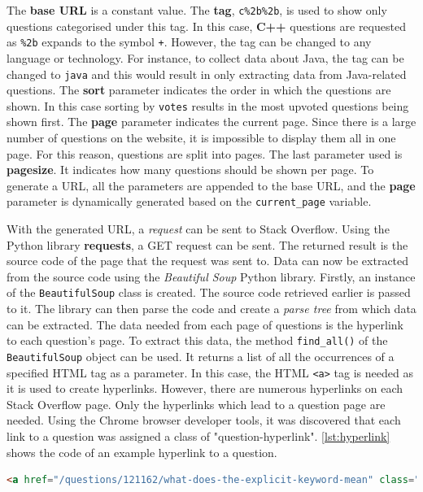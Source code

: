 \documentclass[12pt,a4paper]{article}
\newcommand{\captionstyle}[1] {
    \small{#1}
}
\begin{document}
The \textbf{base URL} is a constant value. The \textbf{tag}, \texttt{c\%2b\%2b}, is used to show only questions categorised under this tag. In this case, \textbf{C++} questions are requested as \texttt{\%2b} expands to the symbol \texttt{+}. However, the tag can be changed to any language or technology. For instance, to collect data about Java, the tag can be changed to \texttt{java} and this would result in only extracting data from Java-related questions. The \textbf{sort} parameter indicates the order in which the questions are shown. In this case sorting by \texttt{votes} results in the most upvoted questions being shown first. The \textbf{page} parameter indicates the current page. Since there is a large number of questions on the website, it is impossible to display them all in one page. For this reason, questions are split into pages. The last parameter used is \textbf{pagesize}. It indicates how many questions should be shown per page. To generate a URL, all the parameters are appended to the base URL, and the \textbf{page} parameter is dynamically generated based on the \texttt{current\_page} variable. 

With the generated URL, a \textit{request} can be sent to Stack Overflow. Using the Python library \textbf{requests}, a GET request can be sent. The returned result is the source code of the page that the request was sent to. Data can now be extracted from the source code using the \textit{Beautiful Soup} Python library. Firstly, an instance of the \texttt{BeautifulSoup} class is created. The source code retrieved earlier is passed to it. The library can then parse the code and create a \textit{parse tree} from which data can be extracted. The data needed from each page of questions is the hyperlink to each question's page. To extract this data, the method \texttt{find\_all()} of the \texttt{BeautifulSoup} object can be used. It returns a list of all the occurrences of a specified HTML tag as a parameter. In this case, the HTML \texttt{<a>} tag is needed as it is used to create hyperlinks. However, there are numerous hyperlinks on each Stack Overflow page. Only the hyperlinks which lead to a question page are needed. Using the Chrome browser developer tools, it was discovered that each link to a question was assigned a class of "question-hyperlink". \cref{lst:hyperlink} shows the code of an example hyperlink to a question.

\begin{lstlisting}[language=html, caption={\captionstyle{An example hyperlink to a Stack Overflow question.}}, label={lst:hyperlink}]
    <a href="/questions/121162/what-does-the-explicit-keyword-mean" class="question-hyperlink">What does the explicit keyword mean?</a>
\end{lstlisting}
\end{document}

